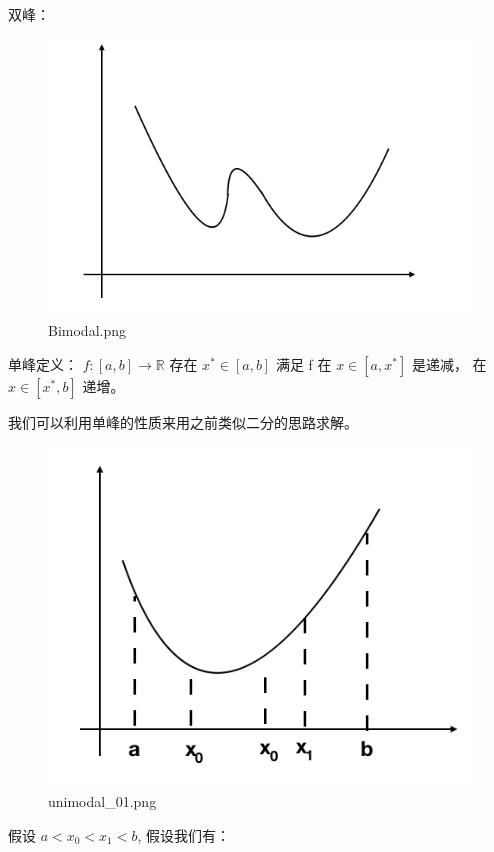 \documentclass[
]{book}
\begin{document}
双峰：

\begin{figure}
\centering
\includegraphics{images/Bimodal.png}
\caption{Bimodal.png}
\end{figure}

单峰定义：
\(f: [a, b] \to \mathbb{R}\) 存在 \(x^* \in [a, b]\) 满足 f 在 \(x \in [a, x^*]\) 是递减， 在 \(x \in [x^*, b]\) 递增。

我们可以利用单峰的性质来用之前类似二分的思路求解。

\begin{figure}
\centering
\includegraphics{images/unimodal_01.png}
\caption{unimodal\_01.png}
\end{figure}

假设 \(a < x_0 < x_1 < b\), 假设我们有：
\end{document}
